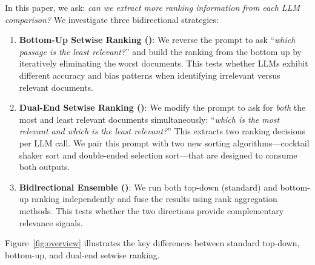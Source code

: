 In this paper, we ask: \emph{can we extract more ranking information from each LLM comparison?} We investigate three bidirectional strategies:

\begin{enumerate}[leftmargin=*]
\item \textbf{Bottom-Up Setwise Ranking (\bottomup{})}: We reverse the prompt to ask ``\emph{which passage is the least relevant?}'' and build the ranking from the bottom up by iteratively eliminating the worst documents. This tests whether LLMs exhibit different accuracy and bias patterns when identifying irrelevant versus relevant documents.

\item \textbf{Dual-End Setwise Ranking (\dualend{})}: We modify the prompt to ask for \emph{both} the most and least relevant documents simultaneously: ``\emph{which is the most relevant and which is the least relevant?}'' This extracts two ranking decisions per LLM call. We pair this prompt with two new sorting algorithms---cocktail shaker sort and double-ended selection sort---that are designed to consume both outputs.

\item \textbf{Bidirectional Ensemble (\bidir{})}: We run both top-down (standard) and bottom-up ranking independently and fuse the results using rank aggregation methods. This tests whether the two directions provide complementary relevance signals.
\end{enumerate}

Figure~\ref{fig:overview} illustrates the key differences between standard top-down, bottom-up, and dual-end setwise ranking.

